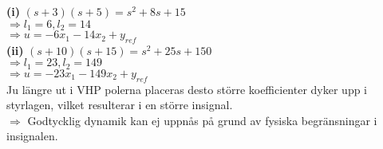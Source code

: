 \documentclass[12pt]{article}
\begin{document}
\textbf{(i)} $(s+3)(s+5) = s^2 + 8s + 15$ \\
$\Rightarrow l_1 = 6, l_2 = 14$ \\
$\Rightarrow u = -6x_1 - 14x_2 + y_{ref}$ \\

\textbf{(ii)} $(s+10)(s+15) = s^2 + 25s + 150$ \\
$\Rightarrow l_1 = 23, l_2 = 149$ \\
$\Rightarrow u = -23x_1 - 149x_2 + y_{ref}$ \\

Ju längre ut i VHP polerna placeras desto  större koefficienter dyker upp i styrlagen, vilket resulterar i en större insignal. \\
$\Rightarrow$ Godtycklig dynamik kan ej uppnås på grund av fysiska begränsningar i insignalen. 
\end{document}
